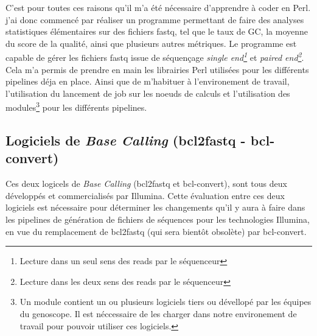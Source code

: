 C'est pour toutes ces raisons qu'il m'a été nécessaire d'apprendre à coder en Perl. j'ai donc commencé par réaliser un programme permettant de faire des analyses statistiques élémentaires sur des fichiers fastq, tel que le taux de GC, la moyenne du score de la qualité, ainsi que plusieurs autres métriques. Le programme est capable de gérer les fichiers fastq issue de séquençage \emph{single end\footnote{Lecture dans un seul sens des reads par le séquenceur}} et \emph{paired end\footnote{Lecture dans les deux sens des reads par le séquenceur}}. Cela m'a permis de prendre en main les librairies Perl utilisées pour les différents pipelines déja en place. Ainsi que de m'habituer à l'environement de travail, l'utilisation du lancement de job sur les noeuds de calculs et l'utilisation des modules\footnote{Un module contient un ou plusieurs logiciels tiers ou dévellopé par les équipes du genoscope. Il est néccessaire de les charger dans notre environement de travail pour pouvoir utiliser ces logiciels.} pour les différents pipelines.

\subsection{Logiciels de \emph{Base Calling} (bcl2fastq - bcl-convert)}
Ces deux logicels de \emph{Base Calling} (bcl2fastq et bcl-convert), sont tous deux développés et commercialisés par Illumina. Cette évaluation entre ces deux logiciels est nécessaire pour déterminer les changements qu'il y aura à faire dans les pipelines de génération de fichiers de séquences pour les technologies Illumina, en vue du remplacement de bcl2fastq (qui sera bientôt obsolète) par bcl-convert.


